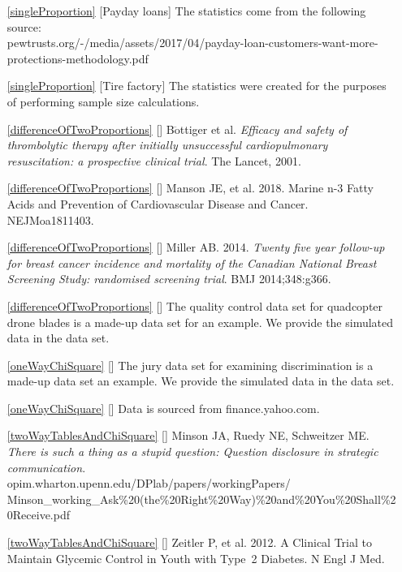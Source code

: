 \begin{itemize}
\item[\ref{singleProportion}]
    [Payday loans]
    The statistics come from the following source: \\
    {\small{}
        {pewtrusts.org/-/media/assets/2017/04/payday-loan-customers-want-more-protections-methodology.pdf}}
\item[\ref{singleProportion}]
    [Tire factory]
    The statistics were created for the purposes
    of performing sample size calculations.

\item[\ref{differenceOfTwoProportions}]
    [\datalink{cpr}]
    B$\ddot{\text{o}}$ttiger et al.
    \emph{Efficacy and safety of thrombolytic therapy after
        initially unsuccessful cardiopulmonary resuscitation:
        a prospective clinical trial}.
        The Lancet, 2001.
\item[\ref{differenceOfTwoProportions}]
    [\datalink{fish\_oil\_18}]
    Manson JE, et al. 2018.
    Marine n-3 Fatty Acids and Prevention of
    Cardiovascular Disease and Cancer. NEJMoa1811403.
\item[\ref{differenceOfTwoProportions}]
    [\datalink{mammogram}]
        {Miller AB. 2014.
            \emph{Twenty five year follow-up for breast cancer
            incidence and mortality of the Canadian National
            Breast Screening Study: randomised screening trial}.
            BMJ 2014;348:g366.}
\item[\ref{differenceOfTwoProportions}]
    [\datalink{drone\_blades}]
    The quality control data set for quadcopter drone blades
    is a made-up data set for an example.
    We provide the simulated data in the
     data set.

\item[\ref{oneWayChiSquare}]
    [\datalink{jury}]
    The jury data set for examining discrimination
    is a made-up data set an example.
    We provide the simulated data in the  data set.
\item[\ref{oneWayChiSquare}]
    [\datalink{sp500\_1950\_2018}]
    Data is sourced from
        {finance.yahoo.com}.

\item[\ref{twoWayTablesAndChiSquare}]
    [\datalink{ask}]
    Minson JA, Ruedy NE, Schweitzer ME.
    \emph{There is such a thing as a stupid question:
    Question disclosure in strategic communication}. \\
    {\small{}
        {opim.wharton.upenn.edu/DPlab/papers/workingPapers/}}\\
    {\small{}
        {Minson\_working\_Ask\%20(the\%20Right\%20Way)\%20and\%20You\%20Shall\%20Receive.pdf}}

\item[\ref{twoWayTablesAndChiSquare}]
    [\datalink{diabetes2}]
    Zeitler P, et al. 2012.
    A Clinical Trial to Maintain Glycemic Control in Youth
    with Type~2 Diabetes.
    N Engl J Med.

\end{itemize}
